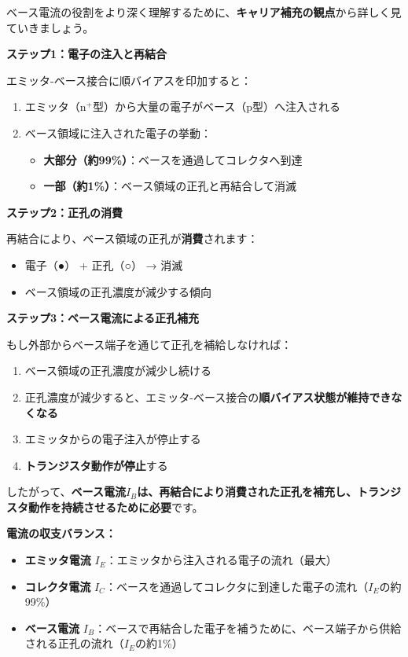 ベース電流の役割をより深く理解するために、\textbf{キャリア補充の観点}から詳しく見ていきましょう。

\textbf{ステップ1：電子の注入と再結合}

エミッタ-ベース接合に順バイアスを印加すると：

\begin{enumerate}
\item エミッタ（n$^+$型）から大量の電子がベース（p型）へ注入される
\item ベース領域に注入された電子の挙動：
\begin{itemize}
\item \textbf{大部分（約99\%）}：ベースを通過してコレクタへ到達
\item \textbf{一部（約1\%）}：ベース領域の正孔と再結合して消滅
\end{itemize}
\end{enumerate}

\textbf{ステップ2：正孔の消費}

再結合により、ベース領域の正孔が\textbf{消費}されます：

\begin{itemize}
\item 電子（●） + 正孔（○） → 消滅
\item ベース領域の正孔濃度が減少する傾向
\end{itemize}

\textbf{ステップ3：ベース電流による正孔補充}

もし外部からベース端子を通じて正孔を補給しなければ：

\begin{enumerate}
\item ベース領域の正孔濃度が減少し続ける
\item 正孔濃度が減少すると、エミッタ-ベース接合の\textbf{順バイアス状態が維持できなくなる}
\item エミッタからの電子注入が停止する
\item \textbf{トランジスタ動作が停止}する
\end{enumerate}

したがって、\textbf{ベース電流$I_B$は、再結合により消費された正孔を補充し、トランジスタ動作を持続させるために必要}です。

\textbf{電流の収支バランス：}

\begin{itemize}
\item \textbf{エミッタ電流} $I_E$：エミッタから注入される電子の流れ（最大）
\item \textbf{コレクタ電流} $I_C$：ベースを通過してコレクタに到達した電子の流れ（$I_E$の約99\%）
\item \textbf{ベース電流} $I_B$：ベースで再結合した電子を補うために、ベース端子から供給される正孔の流れ（$I_E$の約1\%）
\end{itemize}


